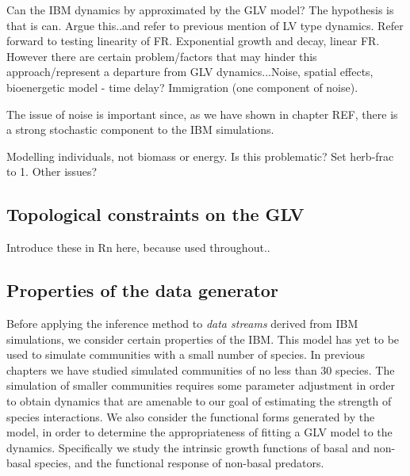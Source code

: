 Can the IBM dynamics by approximated by the GLV model? The hypothesis is that is can. Argue this..and refer to previous mention of LV type dynamics. Refer forward to testing linearity of FR. Exponential growth and decay, linear FR. However there are certain problem/factors that may hinder this approach/represent a departure from GLV dynamics...Noise, spatial effects, bioenergetic model - time delay? Immigration (one component of noise).

The issue of noise is important since, as we have shown in chapter REF, there is a strong stochastic component to the IBM simulations. 

Modelling individuals, not biomass or energy. Is this problematic? Set herb-frac to 1. Other issues?

\subsection{Topological constraints on the GLV}
\label{sec:top_const}

Introduce these in Rn here, because used throughout..

\subsection{Properties of the data generator}
\label{sec:prop_ibm_gen}

Before applying the inference method to \emph{data streams} derived from IBM simulations, we consider certain properties of the IBM. This model has yet to be used to simulate communities with a small number of species. In previous chapters we have studied simulated communities of no less than 30 species. The simulation of smaller communities requires some parameter adjustment in order to obtain dynamics that are amenable to our goal of estimating the strength of species interactions. We also consider the functional forms generated by the model, in order to determine the appropriateness of fitting a GLV model to the dynamics. Specifically we study the intrinsic growth functions of basal and non-basal species, and the functional response of non-basal predators. 

